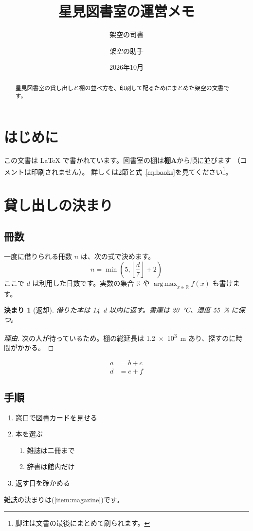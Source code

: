 \documentclass[a4paper]{jsarticle}
\title{星見図書室の運営メモ}
\author{架空の司書 \and 架空の助手}
\date{2026年10月}
\newtheorem{kimari}{決まり}[section]
\newcommand{\R}{\mathbb{R}}
\newcommand{\shelf}[1]{\textbf{棚#1}}
\DeclareMathOperator{\argmax}{arg\,max}
\begin{document}
\maketitle

\begin{abstract}
星見図書室の貸し出しと棚の並べ方を、印刷して配るためにまとめた架空の文書です。
\end{abstract}

\tableofcontents

\section{はじめに}\label{sec:intro}
この文書は \LaTeX{} で書かれています。図書室の棚は\shelf{A}から順に並びます%
（コメントは印刷されません）。
詳しくは\ref{sec:rules}節と式~\eqref{eq:books}を見てください\footnote{脚注は文書の最後にまとめて刷られます。}。

\section{貸し出しの決まり}\label{sec:rules}
\subsection{冊数}
一度に借りられる冊数 $n$ は、次の式で決めます。
\begin{equation}
  n = \min\left(5, \left\lfloor \frac{d}{7} \right\rfloor + 2\right) \label{eq:books}
\end{equation}
ここで $d$ は利用した日数です。実数の集合 $\R$ や $\argmax_{x \in \R} f(x)$ も書けます。

\begin{kimari}[返却]\label{rule:return}
借りた本は \qty{14}{\day} 以内に返す。書庫は \qty{20}{\degreeCelsius}、湿度 \qty{55}{\percent} に保つ。
\end{kimari}

\begin{proof}[理由]
次の人が待っているため。棚の総延長は \qty{1.2e3}{\metre} あり、探すのに時間がかかる\cite{hoshimi2026}。
\end{proof}

\begin{align*}
  a &= b + c \\
  d &= e + f
\end{align*}

\subsection{手順}
\begin{enumerate}
  \item 窓口で図書カードを見せる
  \item 本を選ぶ
  \begin{enumerate}[label=(\alph*)]
    \item 雑誌は二冊まで\label{item:magazine}
    \item 辞書は館内だけ
  \end{enumerate}
  \item 返す日を確かめる
\end{enumerate}
雑誌の決まりは(\ref{item:magazine})です。
\end{document}
